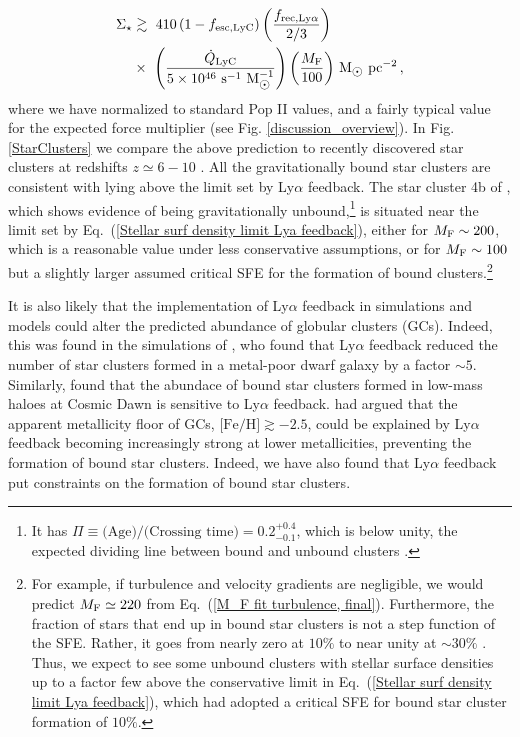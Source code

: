 \documentclass[fleqn,usenatbib]{mnras}
\newcommand\Msun{\text{M}_{\astrosun}} %
\begin{document}
\begin{align}
    \Sigma_{\star} &\gtrsim~ 410 \, (1-f_{\rm esc,LyC}) \left( \dfrac{f_{\rm rec,Ly\alpha}}{2/3} \right) \label{Stellar surf density limit Lya feedback} \\ &\times~ \left( \dfrac{\Dot{Q}_{\rm LyC}}{5 \times 10^{46}~ \textrm{s}^{-1} ~ \Msun^{-1}} \right)  \left( \dfrac{M_{\rm F}}{100} \right) \, \rm \Msun ~ \textrm{pc}^{-2} \nonumber \, ,
\end{align}
where we have normalized to standard Pop II values, and a fairly typical value for the expected force multiplier (see Fig. \ref{discussion_overview}). In Fig. \ref{StarClusters} we compare the above prediction to recently discovered star clusters at redshifts $z \simeq 6-10$ \citep{Vanzella2023, Adamo2024, Mowla2024}. All the gravitationally bound star clusters are consistent with lying above the limit set by Ly$\alpha$ feedback. The star cluster 4b of \cite{Vanzella2023}, which shows evidence of being gravitationally unbound,\footnote{It has $\Pi \equiv \textrm{(Age)/(Crossing time)} = 0.2_{-0.1}^{+0.4}$, which is below unity, the expected dividing line between bound and unbound clusters \citep{Gieles2011}.} is situated near the limit set by Eq.~(\ref{Stellar surf density limit Lya feedback}), either for $M_{\rm F} \sim 200$, which is a reasonable value under less conservative assumptions, or for $M_{\rm F} \sim 100$ but a slightly larger assumed critical SFE for the formation of bound clusters.\footnote{For example, if turbulence and velocity gradients are negligible, we would predict $M_{\rm F} \simeq 220$ from Eq.~(\ref{M_F fit turbulence, final}). Furthermore, the fraction of stars that end up in bound star clusters is not a step function of the SFE. Rather, it goes from nearly zero at $10\%$ to near unity at $\sim 30\%$ \citep{Adams2000, Li2019, Fukushima2021}. Thus, we expect to see some unbound clusters with stellar surface densities up to a factor few above the conservative limit in Eq.~(\ref{Stellar surf density limit Lya feedback}), which had adopted a critical SFE for bound star cluster formation of $10\%$. } 

It is also likely that the implementation of Ly$\alpha$ feedback in simulations and models could alter the predicted abundance of globular clusters (GCs). Indeed, this was found in the simulations of \cite{Kimm2018}, who found that Ly$\alpha$ feedback reduced the number of star clusters formed in a metal-poor dwarf galaxy by a factor $\sim 5$. Similarly, \cite{Nebrin2022} found that the abundace of bound star clusters formed in low-mass haloes at Cosmic Dawn is sensitive to Ly$\alpha$ feedback. \cite{Abe2018} had argued that the apparent metallicity floor of GCs, $\textrm{[Fe/H]} \gtrsim -2.5$, could be explained by Ly$\alpha$ feedback becoming increasingly strong at lower metallicities, preventing the formation of bound star clusters. Indeed, we have also found that Ly$\alpha$ feedback put constraints on the formation of bound star clusters. 
\end{document}
